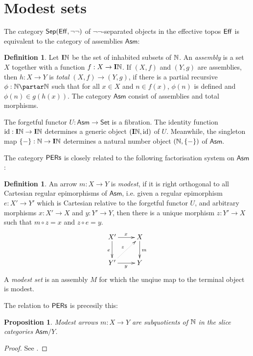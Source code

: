 \documentclass[12pt, a4paper]{article}
\theoremstyle{plain}
\newtheorem{prop}[theorem]{Proposition}
\theoremstyle{definition}
\newtheorem{defin}[theorem]{Definition}
\newcommand\Cat{\mathsf}
\newcommand\id{\mathrm{id}}
\newcommand\Set{\Cat{Set}}
\begin{document}
\section{Modest sets}
\newcommand\Asm{\mathsf{Asm}}%
\newcommand\inh{\mathbf I}%
\newcommand\set[1]{\left\{#1\right\}}
The category $\mathsf{Sep}(\mathsf{Eff},\neg\neg)$ of $\neg\neg$-separated objects in the effective topos $\mathsf{Eff}$ is equivalent to the category of assemblies $\Asm$: 
\begin{defin} Let $\inh \N$ be the set of inhabited subsets of $\mathbb N$. An \emph{assembly} is a set $X$ together with a function $f:X\to \inh \N$. If $(X,f)$ and $(Y,g)$ are assemblies, then $h:X\to Y$ is \emph{total} $(X,f)\to (Y,g)$, if there is a partial recursive $\phi:\N\partar\N$ such that for all $x\in X$ and $n\in f(x)$, $\phi(n)$ is defined and $\phi(n)\in g(h(x))$. The category $\Asm$ consist of assemblies and total morphisms.
\end{defin}

The forgetful functor $U:\Asm\to \Set$ is a fibration. The identity function $\id:\inh \N\to\inh \N$ determines a generic object $(\inh \N,\id)$ of $U$. Meanwhile, the singleton map $\set-:\N \to \inh \N$ determines a natural number object $(\N,\set-)$ of $\Asm$.

The category $\mathsf{PERs}$ is closely related to the following factorisation system on $\Asm$:

\begin{defin} An arrow $m:X\to Y$ is \emph{modest}, if it is right orthogonal to all Cartesian regular epimorphisms of $\Asm$, i.e. given a regular epimorphism $e:X'\to Y'$ which is Cartesian relative to the forgetful functor $U$, and arbitrary morphisms $x:X'\to X$ and $y:Y'\to Y$, then there is a unique morphism $z: Y'\to X$ such that $m\circ z = x$ and $z\circ e = y$.
\[ \xymatrix{
X'\ar[d]_e\ar[r]^x & X\ar[d]^m \\
Y'\ar[r]_y\ar@{.>}[ur]^z & Y
}\]
A \emph{modest set} is an assembly $M$ for which the unqiue map to the terminal object is modest.
\end{defin}

The relation to $\mathsf{PERs}$ is precesily this:
\begin{prop} Modest arrows $m:X\to Y$ are subquotients of $\mathbb N$ in the slice categories $\Asm/Y$. \end{prop}

\begin{proof} See \cite{MR1023803}. \end{proof}
\end{document}

